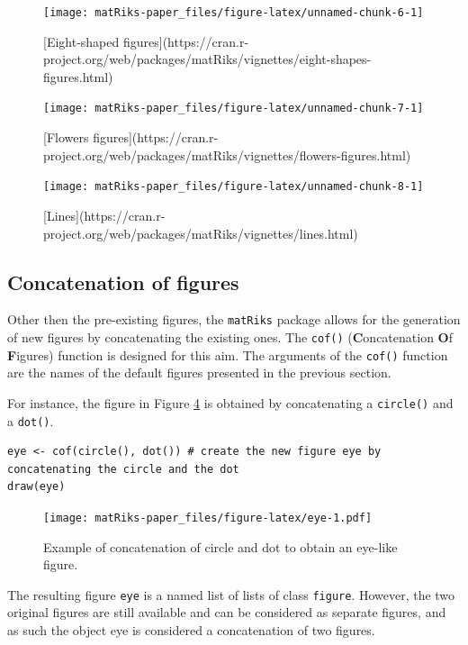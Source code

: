 \begin{figure}
\texttt{[image: matRiks-paper\_files/figure-latex/unnamed-chunk-6-1]} \caption{[Eight-shaped figures](https://cran.r-project.org/web/packages/matRiks/vignettes/eight-shapes-figures.html)}\label{fig:unnamed-chunk-6}
\end{figure}

\begin{figure}
\texttt{[image: matRiks-paper\_files/figure-latex/unnamed-chunk-7-1]} \caption{[Flowers figures](https://cran.r-project.org/web/packages/matRiks/vignettes/flowers-figures.html)}\label{fig:unnamed-chunk-7}
\end{figure}

\begin{figure}
\texttt{[image: matRiks-paper\_files/figure-latex/unnamed-chunk-8-1]} \caption{[Lines](https://cran.r-project.org/web/packages/matRiks/vignettes/lines.html)}\label{fig:unnamed-chunk-8}
\end{figure}

\subsection{Concatenation of figures}\label{concatenation-of-figures}

Other then the pre-existing figures, the \texttt{matRiks} package allows for the generation of new figures by concatenating the existing ones.
The \texttt{cof()} (\textbf{C}oncatenation \textbf{O}f \textbf{F}igures) function is designed for this aim.
The arguments of the \texttt{cof()} function are the names of the default figures presented in the previous section.

For instance, the figure in Figure \ref{fig:eye} is obtained by concatenating a \texttt{circle()} and a \texttt{dot()}.

\begin{verbatim}
eye <- cof(circle(), dot()) # create the new figure eye by concatenating the circle and the dot
draw(eye)
\end{verbatim}

\begin{figure}
\centering
\texttt{[image: matRiks-paper\_files/figure-latex/eye-1.pdf]}
\caption{\label{fig:eye}Example of concatenation of circle and dot to obtain an eye-like figure.}
\end{figure}

The resulting figure \texttt{eye} is a named list of lists of class \texttt{figure}.
However, the two original figures are still available and can be considered as separate figures, and as such the object eye is considered a concatenation of two figures.

